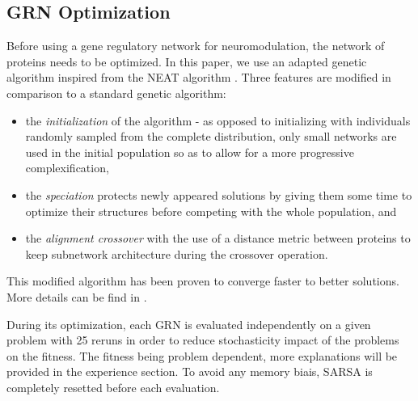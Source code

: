 \subsection{GRN Optimization}
Before using a gene regulatory network for neuromodulation, the network of proteins needs to be optimized. In this paper, we use an adapted genetic algorithm inspired from the NEAT algorithm \cite{stanley2002evolving}. Three features are modified in comparison to a standard genetic algorithm:
\begin{itemize}
\item the \emph{initialization} of the algorithm  - as opposed to initializing with individuals randomly sampled from the complete distribution, only small networks are used in the initial population so as to allow for a more progressive complexification,
\item the \emph{speciation} protects newly appeared solutions by giving them some time to optimize their structures before competing with the whole population, and
\item the \emph{alignment crossover} with the use of a distance metric between proteins to keep subnetwork architecture during the crossover operation.
\end{itemize}
This modified algorithm has been proven to converge faster to better solutions. More details can be find in \cite{cussatblanc2015grneat}.

During its optimization, each GRN is evaluated independently on a given problem with 25 reruns in order to reduce stochasticity impact of the problems on the fitness. The fitness being problem dependent, more explanations will be provided in the experience section. To avoid any memory biais, SARSA is completely resetted before each evaluation. 





